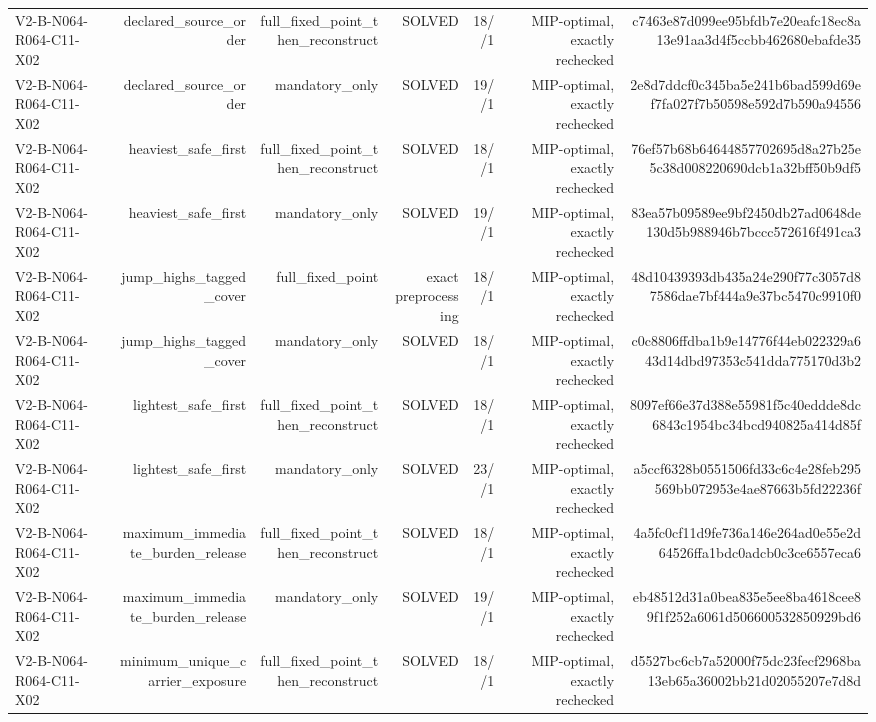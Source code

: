 {\begin{longtable}{lrrrrrr}
V2-B-N064-R064-C11-X02 & declared\_source\_order & full\_fixed\_point\_then\_reconstruct & SOLVED & 18//1 & MIP-optimal, exactly rechecked & c7463e87d099ee95bfdb7e20eafc18ec8a13e91aa3d4f5ccbb462680ebafde35 \\
V2-B-N064-R064-C11-X02 & declared\_source\_order & mandatory\_only & SOLVED & 19//1 & MIP-optimal, exactly rechecked & 2e8d7ddcf0c345ba5e241b6bad599d69ef7fa027f7b50598e592d7b590a94556 \\
V2-B-N064-R064-C11-X02 & heaviest\_safe\_first & full\_fixed\_point\_then\_reconstruct & SOLVED & 18//1 & MIP-optimal, exactly rechecked & 76ef57b68b64644857702695d8a27b25e5c38d008220690dcb1a32bff50b9df5 \\
V2-B-N064-R064-C11-X02 & heaviest\_safe\_first & mandatory\_only & SOLVED & 19//1 & MIP-optimal, exactly rechecked & 83ea57b09589ee9bf2450db27ad0648de130d5b988946b7bccc572616f491ca3 \\
V2-B-N064-R064-C11-X02 & jump\_highs\_tagged\_cover & full\_fixed\_point & exact preprocessing & 18//1 & MIP-optimal, exactly rechecked & 48d10439393db435a24e290f77c3057d87586dae7bf444a9e37bc5470c9910f0 \\
V2-B-N064-R064-C11-X02 & jump\_highs\_tagged\_cover & mandatory\_only & SOLVED & 18//1 & MIP-optimal, exactly rechecked & c0c8806ffdba1b9e14776f44eb022329a643d14dbd97353c541dda775170d3b2 \\
V2-B-N064-R064-C11-X02 & lightest\_safe\_first & full\_fixed\_point\_then\_reconstruct & SOLVED & 18//1 & MIP-optimal, exactly rechecked & 8097ef66e37d388e55981f5c40eddde8dc6843c1954bc34bcd940825a414d85f \\
V2-B-N064-R064-C11-X02 & lightest\_safe\_first & mandatory\_only & SOLVED & 23//1 & MIP-optimal, exactly rechecked & a5ccf6328b0551506fd33c6c4e28feb295569bb072953e4ae87663b5fd22236f \\
V2-B-N064-R064-C11-X02 & maximum\_immediate\_burden\_release & full\_fixed\_point\_then\_reconstruct & SOLVED & 18//1 & MIP-optimal, exactly rechecked & 4a5fc0cf11d9fe736a146e264ad0e55e2d64526ffa1bdc0adcb0c3ce6557eca6 \\
V2-B-N064-R064-C11-X02 & maximum\_immediate\_burden\_release & mandatory\_only & SOLVED & 19//1 & MIP-optimal, exactly rechecked & eb48512d31a0bea835e5ee8ba4618cee89f1f252a6061d506600532850929bd6 \\
V2-B-N064-R064-C11-X02 & minimum\_unique\_carrier\_exposure & full\_fixed\_point\_then\_reconstruct & SOLVED & 18//1 & MIP-optimal, exactly rechecked & d5527bc6cb7a52000f75dc23fecf2968ba13eb65a36002bb21d02055207e7d8d \\

\end{longtable}}

